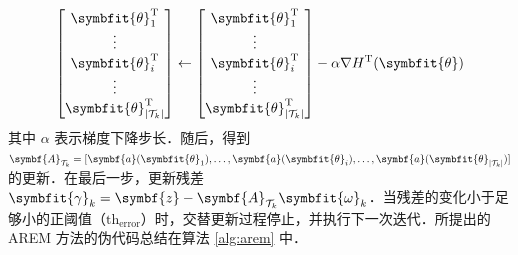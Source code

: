 \documentclass[a4paper,zihao=-4]{ctexart}
\renewcommand{\mathbf}[1]{\symbf{#1}}
\renewcommand{\boldsymbol}[1]{\symbfit{#1}}
\begin{document}
\begin{equation}
    \label{eq:gradient_update}
    \begin{bmatrix}
        \boldsymbol{\theta}_1^{\mathrm{T}} \\
        \vdots \\
        \boldsymbol{\theta}_i^{\mathrm{T}} \\
        \vdots \\
        \boldsymbol{\theta}_{|\mathcal{T}_k|}^{\mathrm{T}}
    \end{bmatrix}
    \leftarrow
    \begin{bmatrix}
        \boldsymbol{\theta}_1^{\mathrm{T}} \\
        \vdots \\
        \boldsymbol{\theta}_i^{\mathrm{T}} \\
        \vdots \\
        \boldsymbol{\theta}_{|\mathcal{T}_k|}^{\mathrm{T}}
    \end{bmatrix}
    - \alpha \nabla H^{\mathrm{T}}(\boldsymbol{\theta})
\end{equation}
其中 $\alpha$ 表示梯度下降步长．随后，得到 $\mathbf{A}_{\mathcal{T}_k} = [\mathbf{a}(\boldsymbol{\theta}_1), \dots, \mathbf{a}(\boldsymbol{\theta}_i), \dots, \mathbf{a}(\boldsymbol{\theta}_{|\mathcal{T}_k|})]$ 的更新．在最后一步，更新残差 $\boldsymbol{\gamma}_k = \mathbf{z} - \mathbf{A}_{\mathcal{T}_k}\boldsymbol{\omega}_k$．当残差的变化小于足够小的正阈值（$\mathrm{th}_{\text{error}}$）时，交替更新过程停止，并执行下一次迭代．所提出的 AREM 方法的伪代码总结在算法 \ref{alg:arem} 中．
\end{document}
